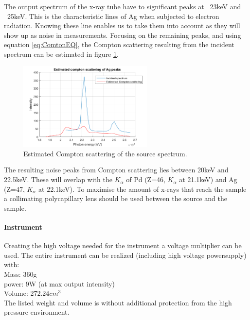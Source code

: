 The output spectrum of the x-ray tube have to significant peaks at ~23keV and ~25keV. This is the characteristic lines of Ag when subjected to electron radiation. Knowing these line enables us to take them into account as they will show up as noise in measurements. Focusing on the remaining peaks, and using equation \ref{eq:ComtonEQ}, the Compton scattering resulting from the incident spectrum can be estimated in figure \ref{fig:AgSpectraCompton}.

\begin{figure}[htb]
	\centering
	\includegraphics[width=0.6\textwidth]{figures/XRF/estComptonAgPeaks.png}
	\caption{Estimated Compton scattering of the source spectrum.}
	\label{fig:AgSpectraCompton}
\end{figure}

The resulting noise peaks from Compton scattering lies between 20keV and 22.5keV. These will overlap with the $K_\alpha$ of Pd (Z=46, $K_\alpha$ at 21.1keV) and Ag (Z=47, $K_\alpha$ at 22.1keV).
To maximise the amount of x-rays that reach the sample a collimating polycapillary lens should be used between the source and the sample.

\paragraph{Instrument}
Creating the high voltage needed for the instrument a voltage multiplier can be used. The entire instrument can be realized (including high voltage powersupply) with\citep{AmptekSource}:\\
Mass: 360g\\
power: 9W (at max output intensity)\\
Volume: $272.24cm^{3}$\\
The listed weight and volume is without additional protection from the high pressure environment.

